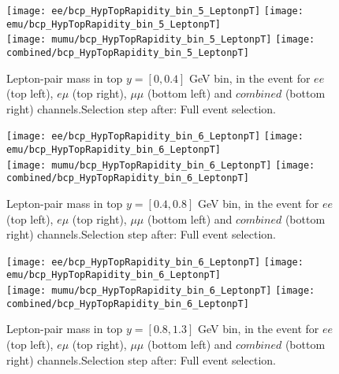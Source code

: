 \documentclass[12pt, a4paper, titlepage]{article}
\begin{document}
\clearpage
\newpage


\begin{figure}
  \texttt{[image: ee/bcp\_HypTopRapidity\_bin\_5\_LeptonpT]}
  \texttt{[image: emu/bcp\_HypTopRapidity\_bin\_5\_LeptonpT]}\\
  \texttt{[image: mumu/bcp\_HypTopRapidity\_bin\_5\_LeptonpT]}
  \texttt{[image: combined/bcp\_HypTopRapidity\_bin\_5\_LeptonpT]}
\caption{Lepton-pair mass in top $y = [0,0.4]$ GeV bin, in the event for $ee$ (top left), $e\mu$ (top right), $\mu\mu$ (bottom left) and $combined$ (bottom right) channels.\newline Selection step after: Full event selection.}
\end{figure}

\clearpage
\newpage

\begin{figure}
  \texttt{[image: ee/bcp\_HypTopRapidity\_bin\_6\_LeptonpT]}
  \texttt{[image: emu/bcp\_HypTopRapidity\_bin\_6\_LeptonpT]}\\
  \texttt{[image: mumu/bcp\_HypTopRapidity\_bin\_6\_LeptonpT]}
  \texttt{[image: combined/bcp\_HypTopRapidity\_bin\_6\_LeptonpT]}
\caption{Lepton-pair mass in top $y = [0.4,0.8]$ GeV bin, in the event for $ee$ (top left), $e\mu$ (top right), $\mu\mu$ (bottom left) and $combined$ (bottom right) channels.\newline Selection step after: Full event selection.}
\end{figure}

\clearpage
\newpage
\begin{figure}
  \texttt{[image: ee/bcp\_HypTopRapidity\_bin\_6\_LeptonpT]}
  \texttt{[image: emu/bcp\_HypTopRapidity\_bin\_6\_LeptonpT]}\\
  \texttt{[image: mumu/bcp\_HypTopRapidity\_bin\_6\_LeptonpT]}
  \texttt{[image: combined/bcp\_HypTopRapidity\_bin\_6\_LeptonpT]}
\caption{Lepton-pair mass in top $y = [0.8,1.3]$ GeV bin, in the event for $ee$ (top left), $e\mu$ (top right), $\mu\mu$ (bottom left) and $combined$ (bottom right) channels.\newline Selection step after: Full event selection.}
\end{figure}
\end{document}
